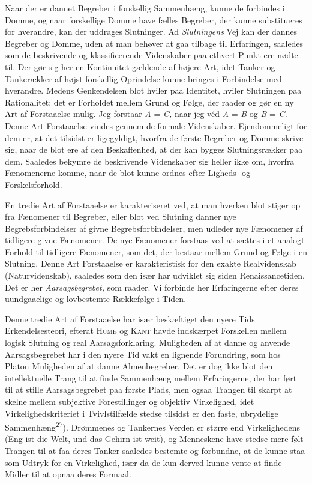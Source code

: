 \documentclass[12pt,a4paper,openany]{book}
\newcommand{\opage}[1]{\marginnote{\footnotesize\textit{[#1]}}}
\begin{document}
Naar der er dannet Begreber i forskellig Sammenhæng, kunne de forbindes i
Domme, og naar forskellige Domme have fælles Begreber, der kunne substitueres
for hverandre, kan der uddrages Slutninger. Ad \textit{Slutningens} Vej kan der
dannes Begreber og Domme, uden at man behøver at gaa tilbage til Erfaringen,
saaledes som de beskrivende og klassificerende Videnskaber paa ethvert Punkt
ere nødte til. Der gør sig her en Kontinuitet gældende af højere Art, idet
Tanker og Tankerækker af højst forskellig Oprindelse kunne bringes i
Forbindelse med hverandre. Medens Genkendelsen blot hviler paa Identitet,
hviler Slutningen paa Rationalitet: det er Forholdet mellem Grund og Følge, der
raader og gør en ny Art af Forstaaelse mulig. Jeg forstaar \textit{A} =
\textit{C,} naar jeg véd \textit{A} = \textit{B} og \textit{B} = \textit{C.}
Denne Art Forstaaelse vindes gennem de formale Videnskaber. Ejendommeligt for
dem er, at det tilsidst er ligegyldigt, hvorfra de første Begreber og Domme
skrive sig, naar de blot ere af den Beskaffenhed, at der kan bygges
Slutningsrækker paa dem. Saaledes bekymre de beskrivende Videnskaber sig heller
ikke om, hvorfra Fænomenerne komme, naar de blot kunne ordnes efter Ligheds- og
Forskelsforhold.

En tredie Art af Forstaaelse er karakteriseret ved, at man
\opage{30}hverken blot stiger op fra Fænomener til Begreber, eller blot ved
Slutning danner nye Begrebsforbindelser af givne Begrebsforbindelser, men
udleder nye Fænomener af tidligere givne Fænomener. De nye Fænomener forstaas
ved at sættes i et analogt Forhold til tidligere Fænomener, som det, der
bestaar mellem Grund og Følge i en Slutning. Denne Art Forstaaelse er
karakteristisk for den exakte Realvidenskab (Naturvidenskab), saaledes som den
især har udviklet sig siden Renaissancetiden. Det er her
\textit{Aarsagsbegrebet,} som raader. Vi forbinde her Erfaringerne efter deres
uundgaaelige og lovbestemte Rækkefølge i Tiden.

Denne tredie Art af Forstaaelse har især beskæftiget den nyere Tids
Erkendelsesteori, efterat \textsc{Hume} og \textsc{Kant} havde indskærpet
Forskellen mellem logisk Slutning og real Aarsagsforklaring. Muligheden af at
danne og anvende Aarsagsbegrebet har i den nyere Tid vakt en lignende
Forundring, som hos Platon Muligheden af at danne Almenbegreber. Det er dog
ikke blot den intellektuelle Trang til at finde Sammenhæng mellem Erfaringerne,
der har ført til at stille Aarsagsbegrebet paa første Plads, men ogsaa Trangen
til skarpt at skelne mellem subjektive Forestillinger og objektiv Virkelighed,
idet Virkelighedskriteriet i Tvivlstilfælde stedse tilsidst er den faste,
ubrydelige Sammenhæng\textsuperscript{27}). Drømmenes og Tankernes Verden er
større end Virkelighedens (Eng ist die Welt, und das Gehirn ist weit), og
Menneskene have stedse mere følt Trangen til at faa deres Tanker saaledes
bestemte og forbundne, at de kunne staa som Udtryk for en Virkelighed, især da
de kun derved kunne vente at finde Midler til at opnaa deres Formaal.
\end{document}
